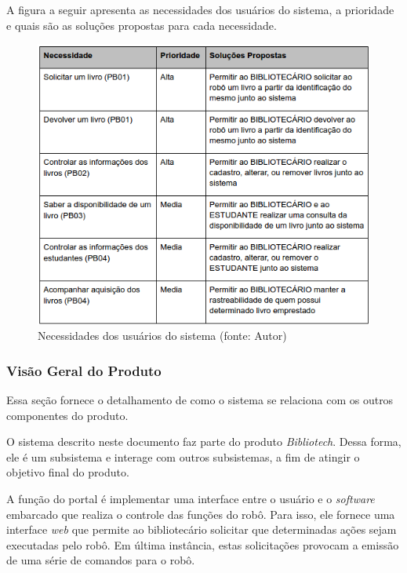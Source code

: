 A figura a seguir apresenta as necessidades dos usuários do sistema, a prioridade e quais são as soluções propostas para cada necessidade.

\begin{figure}[!h]
\centering
\includegraphics[scale=0.65, angle = 360]{figuras/necessidades_soft}
\caption[]{Necessidades dos usuários do sistema (fonte: Autor)}
\end{figure}
\FloatBarrier

\subsubsection{Visão Geral do Produto}
Essa seção fornece o detalhamento de como o sistema se relaciona com os outros componentes do produto.

O sistema descrito neste documento faz parte do produto \textit{Bibliotech}. Dessa forma, ele é um subsistema e interage com outros subsistemas, a fim de atingir o objetivo final do produto.

A função do portal é implementar uma interface entre o usuário e o \textit{software} embarcado que realiza o controle das funções do robô. Para isso, ele fornece uma interface \textit{web} que permite ao bibliotecário solicitar que determinadas ações sejam executadas pelo robô. Em última instância, estas solicitações provocam a emissão de uma série de comandos para o robô.

